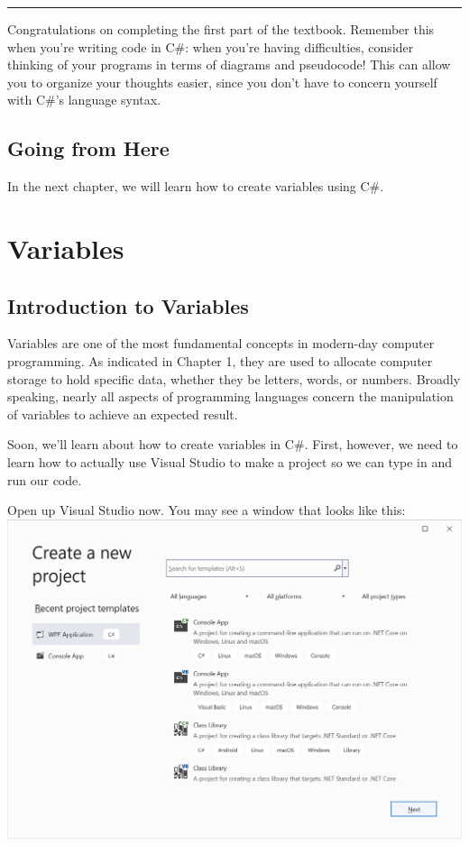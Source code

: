 \documentclass[oneside, openany] {book}
\begin{document}
\rule{\textwidth}{0.4pt}
Congratulations on completing the first part of the textbook. Remember this when you're writing code in C\#: when you're having difficulties, consider thinking of your programs in terms of diagrams and pseudocode! This can allow you to organize your thoughts easier, since you don't have to concern yourself with C\#'s language syntax.
\section*{Going from Here}
In the next chapter, we will learn how to create variables using C\#.
\chapter{Variables}
\minitoc
\textbf{}
\section{Introduction to Variables}
Variables are one of the most fundamental concepts in modern-day computer programming. As indicated in Chapter 1, they are used to allocate computer storage to hold specific data, whether they be letters, words, or numbers. Broadly speaking, nearly all aspects of programming languages concern the manipulation of variables to achieve an expected result.

Soon, we'll learn about how to create variables in C\#. First, however, we need to learn how to actually use Visual Studio to make a project so we can type in and run our code.

Open up Visual Studio now. You may see a window that looks like this:
\includegraphics[scale=0.5]{CreateProject}
\end{document}
